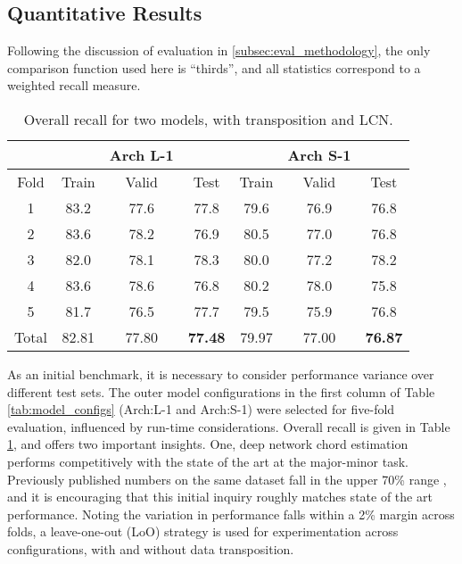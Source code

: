 \subsection{Quantitative Results}
\label{subsec:quantitative_results}

Following the discussion of evaluation in \ref{subsec:eval_methodology}, the only comparison function used here is ``thirds'', and all statistics correspond to a weighted recall measure.

\begin{table}[!t]
\caption{Overall recall for two models, with transposition and LCN.}
\label{tab:exp1res}
\centering
\begin{tabular}{c || c c c || c c c |}
 & & Arch L-1 & & & Arch S-1 & \\
 \hline
Fold & Train & Valid & Test & Train & Valid & Test \\
\hline
1 & 83.2 & 77.6 & 77.8 &  79.6 & 76.9 & 76.8 \\
2 & 83.6 & 78.2 & 76.9 & 80.5 & 77.0 & 76.8 \\
3 & 82.0 & 78.1 & 78.3 & 80.0 & 77.2 & 78.2\\
4 & 83.6 & 78.6 & 76.8 & 80.2 & 78.0 & 75.8 \\
5 & 81.7 & 76.5 & 77.7 & 79.5 & 75.9 & 76.8 \\
\hline
Total &  82.81 & 77.80 & \textbf{77.48} & 79.97 & 77.00 & \textbf{76.87}\\
\hline
\end{tabular}
\end{table}

As an initial benchmark, it is necessary to consider performance variance over different test sets.
The outer model configurations in the first column of Table \ref{tab:model_configs} (Arch:L-1 and Arch:S-1) were selected for five-fold evaluation, influenced by run-time considerations.
Overall recall is given in Table \ref{tab:exp1res}, and offers two important insights.
One, deep network chord estimation performs competitively with the state of the art at the major-minor task.
Previously published numbers on the same dataset fall in the upper 70\% range \cite{Cho2011}, and it is encouraging that this initial inquiry roughly matches state of the art performance.
Noting the variation in performance falls within a 2\% margin across folds, a leave-one-out (LoO) strategy is used for experimentation across configurations, with and without data transposition.

